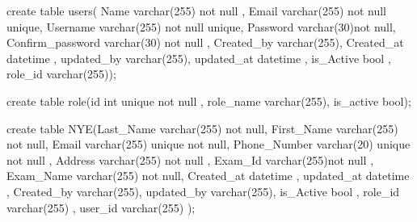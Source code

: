 create table users( Name varchar(255) not null ,
 Email varchar(255) not null unique,
 Username varchar(255) not null unique,
 Password varchar(30)not null,
 Confirm_password varchar(30) not null ,
 Created_by varchar(255),
 Created_at datetime ,
 updated_by varchar(255),
 updated_at datetime ,
 is_Active bool ,
 role_id varchar(255));
 
 create table role(id int unique not null ,
 role_name varchar(255),
 is_active bool);
 
 
 create table NYE(Last_Name varchar(255)   not null,
First_Name varchar(255)  not null,
 Email varchar(255)  unique not null,
 Phone_Number varchar(20) unique not null ,
 Address varchar(255) not null ,
 Exam_Id varchar(255)not null ,
 Exam_Name varchar(255) not null,
 Created_at datetime ,
 updated_at datetime ,
 Created_by varchar(255),
 updated_by varchar(255),
 is_Active bool ,
 role_id varchar(255) ,
 user_id varchar(255) );